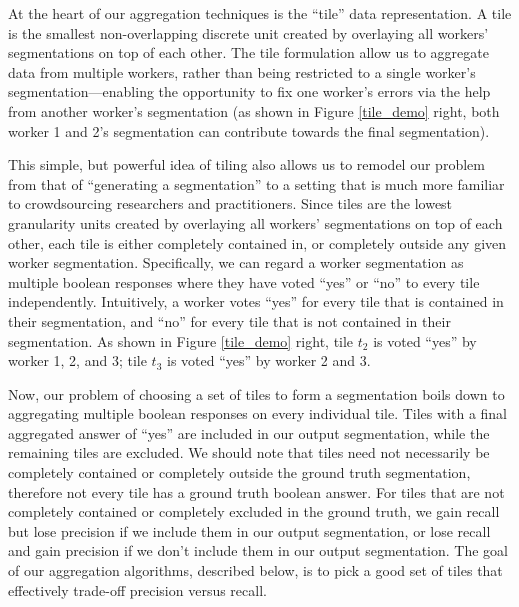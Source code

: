 At the heart of our aggregation techniques is the ``tile'' data representation. A tile is the smallest non-overlapping discrete unit created by overlaying all workers' segmentations on top of each other. %
The tile formulation allow us to aggregate data from multiple workers, rather than being restricted to a single worker's segmentation---enabling the opportunity to fix one worker's errors via the help from another worker's segmentation (as shown in Figure \ref{tile_demo} right, both worker 1 and 2's segmentation can contribute towards the final segmentation).
\par This simple, but powerful idea of tiling also allows us to remodel our problem from that of ``generating a segmentation'' to a setting that is much more familiar to crowdsourcing researchers and practitioners. Since tiles are the lowest granularity units created by overlaying all workers' segmentations on top of each other, each tile is either completely contained in, or completely outside any given worker segmentation. Specifically, we can regard a worker segmentation as multiple boolean responses where they have voted ``yes'' or ``no'' to every tile independently. Intuitively, a worker   votes ``yes'' for every tile that is contained in their segmentation, and ``no'' for every tile that is not contained in their segmentation. As shown in Figure \ref{tile_demo} right, tile $t_2$ is voted ``yes'' by worker 1, 2, and 3; tile $t_3$ is voted ``yes'' by worker 2 and 3.  
\par Now, our problem of choosing a set of tiles to form a segmentation boils down to aggregating multiple boolean responses on every individual tile. Tiles with a final aggregated answer of ``yes'' are included in our output segmentation, while the remaining tiles are excluded. We should note that tiles need not necessarily be completely contained or completely outside the ground truth segmentation, therefore not every tile has a ground truth boolean answer. For tiles that are not completely contained or completely excluded in the ground truth, we gain recall but lose precision if we include them in our output segmentation, or lose recall and gain precision if we don't include them in our output segmentation. The goal of our aggregation algorithms, described below, is to pick a good set of tiles that effectively trade-off precision versus recall.

